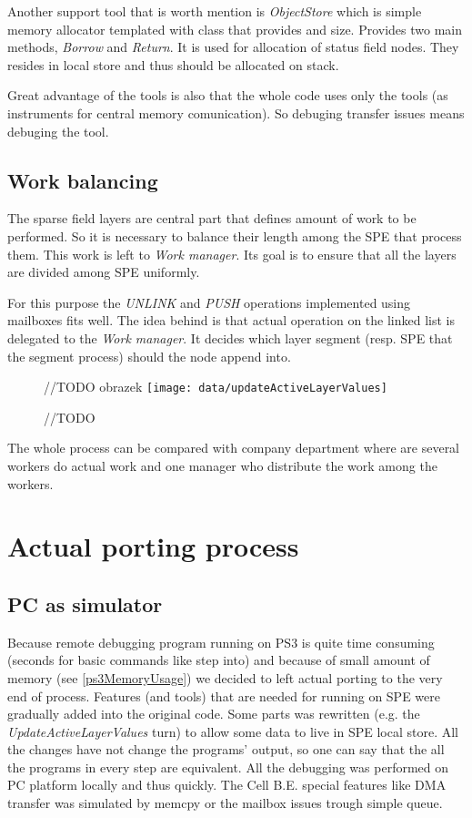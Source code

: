 Another support tool that is worth mention is \emph{ObjectStore} which is simple memory allocator templated with class that provides and size.
Provides two main methods, \emph{Borrow} and \emph{Return}.
It is used for allocation of status field nodes.
They resides in local store and thus should be allocated on stack.

Great advantage of the tools is also that the whole code uses only the tools (as instruments for central memory comunication).
So debuging transfer issues means debuging the tool.

\subsection{Work balancing}

The sparse field layers are central part that defines amount of work to be performed.
So it is necessary to balance their length among the SPE that process them.
This work is left to \emph{Work manager}.
Its goal is to ensure that all the layers are divided among SPE uniformly.

For this purpose the \emph{UNLINK} and \emph{PUSH} operations implemented using mailboxes fits well.
The idea behind is that actual operation on the linked list is delegated to the \emph{Work manager}.
It decides which layer segment (resp. SPE that the segment process) should the node append into.

\begin{figure}	//TODO obrazek
    \centering
    \texttt{[image: data/updateActiveLayerValues]}
    \caption[Diagram of new design components]{//TODO}
    \label{fg:updateActiveLayerValues}
\end{figure}

The whole process can be compared with company department where are several workers do actual work and one manager who distribute the work among the workers.

\section{Actual porting process}

\subsection{PC as simulator}
Because remote debugging program running on PS3 is quite time consuming (seconds for basic commands like step into) and because of small amount of memory (see \ref{ps3MemoryUsage}) we decided to left actual porting to the very end of process.
Features (and tools) that are needed for running on SPE were gradually added into the original code.
Some parts was rewritten (e.g. the \emph{UpdateActiveLayerValues} turn) to allow some data to live in SPE local store.
All the changes have not change the programs' output, so one can say that the all the programs in every step are equivalent.
All the debugging was performed on PC platform locally and thus quickly.
The Cell B.E. special features like DMA transfer was simulated by memcpy or the mailbox issues trough simple queue.

